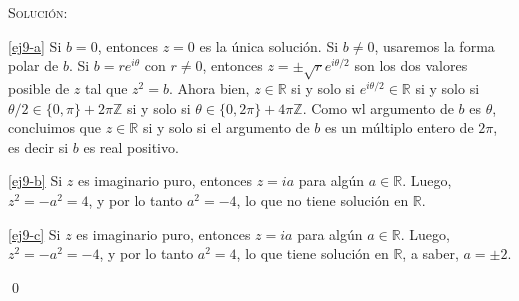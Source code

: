 \documentclass[a4paper,12pt,twoside,spanish,reqno]{amsbook}
\numberwithin{equation}{section}
\newcommand{\rta}{\noindent\textsc{Solución: }}
\newcommand \Z{{\mathbb Z}}
\begin{document}
\begin{enumerate}[topsep=6pt, itemsep=.4cm]
\rta 

\ref{ej9-a} Si $b=0$, entonces $z=0$ es la única solución. Si $b\neq 0$, usaremos la forma polar de $b$. Si $b = r e^{i\theta}$ con $r \ne 0$, entonces $z = \pm \sqrt{r} e^{i\theta/2}$ son los dos valores posible de $z$ tal que $z^2 = b$. Ahora bien, $z \in \mathbb{R}$ si y solo si  $e^{i\theta/2}\in \mathbb{R}$ si y solo si $\theta/2 \in \{0, \pi\} + 2\pi \Z$ si y solo si $\theta \in \{0, 2\pi\} + 4\pi \Z$. Como wl argumento de $b$ es $\theta$, concluimos que $z \in \mathbb{R}$ si y solo si el argumento de $b$ es un múltiplo entero de $2\pi$, es decir si $b$ es real positivo.

\ref{ej9-b} Si $z$ es imaginario puro, entonces $z = i a$ para algún $a \in \mathbb{R}$. Luego, $z^2 = -a^2 = 4$, y por lo tanto $a^2 = -4$, lo que no tiene solución en $\mathbb{R}$.

\ref{ej9-c} Si $z$ es imaginario puro, entonces $z = i a$ para algún $a \in \mathbb{R}$. Luego, $z^2 = -a^2 = -4$, y por lo tanto $a^2 = 4$, lo que tiene solución en $\mathbb{R}$, a saber, $a = \pm 2$.

\qed

    



\end{enumerate}
\end{document}

